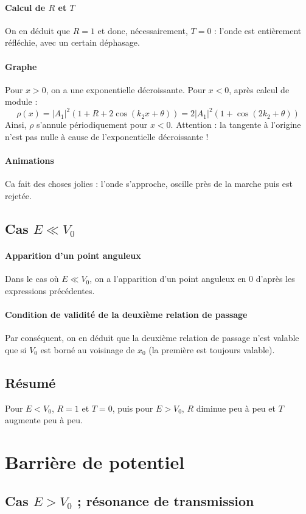\documentclass[french]{book}
\theoremstyle{plain}
\theoremstyle{definition}
\theoremstyle{remark}
\begin{document}
\paragraph{Calcul de $R$ et $T$} On en déduit que $R=1$ et donc, nécessairement, $T=0$ : l'onde est entièrement réfléchie, avec un certain déphasage.
\paragraph{Graphe} Pour $x>0$, on a une exponentielle décroissante. Pour $x<0$, après calcul de module : $$\rho(x)=\lvert A_1\rvert^2\left(1+R+2\cos(k_2x+\theta)\right)=2\lvert A_1\rvert^2\left(1+\cos(2k_2+\theta)\right)$$ Ainsi, $\rho$ s'annule périodiquement pour $x<0$. Attention : la tangente à l'origine n'est pas nulle à cause de l'exponentielle décroissante !
\paragraph{Animations} Ca fait des choses jolies : l'onde s'approche, oscille près de la marche puis est rejetée.
\subsection{Cas $E\ll V_0$}
\paragraph{Apparition d'un point anguleux} Dans le cas où $E\ll V_0$, on a l'apparition d'un point anguleux en $0$ d'après les expressions précédentes.
\paragraph{Condition de validité de la deuxième relation de passage} Par conséquent, on en déduit que la deuxième relation de passage n'est valable que si $V_0$ est borné au voisinage de $x_0$ (la première est toujours valable).
\subsection{Résumé}
Pour $E<V_0$, $R=1$ et $T=0$, puis pour $E>V_0$, $R$ diminue peu à peu et $T$ augmente peu à peu.
\section{Barrière de potentiel}
\subsection{Cas $E>V_0$ ; résonance de transmission}
\end{document}
